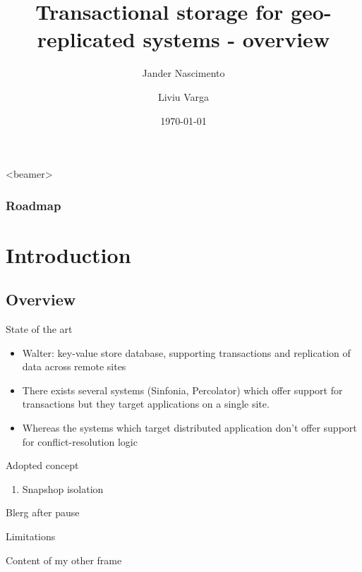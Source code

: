 \documentclass{beamer}
\title[Transactional storage for geo-replicated systems ]{Transactional storage for geo-replicated systems - overview}
\author{Jander Nascimento
\and Liviu Varga}
\institute{Université Joseph Fourier}
\date{\today}
\begin{document}
\begin{frame}
\titlepage
\end{frame}

{
  \begin{frame}<beamer>
    \frametitle{Roadmap}
    \tableofcontents%
  \end{frame}
}


\section{Introduction}

	\subsection{Overview}
	
		\begin{frame}{State of the art}
		
		\begin{itemize}
		\item Walter: key-value store database, supporting transactions and replication of data across remote sites
		\item There exists several systems (Sinfonia, Percolator) which offer support for transactions but they target applications on a single site. 
		\item Whereas the systems which target distributed application don't offer support for conflict-resolution logic
		\end{itemize}
		\end{frame}	
	
		\begin{frame}{Adopted concept}

			\begin{enumerate}
			\item Snapshop isolation
			\end{enumerate}
			
			\pause			
			Blerg after pause
		
			
		\end{frame}

		\begin{frame}{Limitations}

			Content of my other frame	
			
		\end{frame}
		
\end{document}
